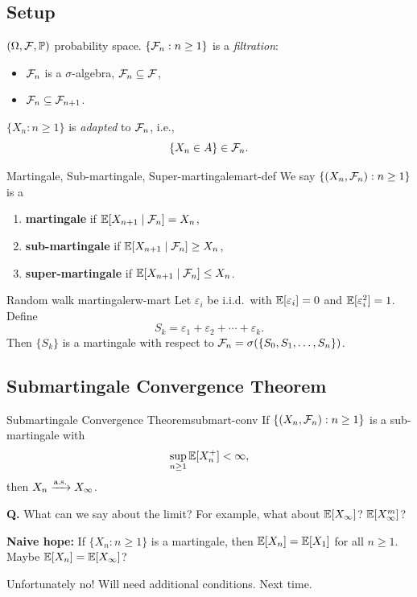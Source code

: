 \subsection{Setup}

$(\Omega, \mathcal{F}, \mathbb{P})$ probability space. $\{\mathcal{F}_n : n \geq 1\}$ is a \emph{filtration}:
\begin{itemize}
    \item $\mathcal{F}_n$ is a $\sigma$-algebra, $\mathcal{F}_n \subseteq \mathcal{F}$,
    \item $\mathcal{F}_n \subseteq \mathcal{F}_{n+1}$.
\end{itemize}

$\{X_n : n \geq 1\}$ is \emph{adapted} to $\mathcal{F}_n$, i.e.,
\[
    \{X_n \in A\} \in \mathcal{F}_n.
\]

\begin{definition}{Martingale, Sub-martingale, Super-martingale}{mart-def}
    We say $\{(X_n, \mathcal{F}_n) : n \geq 1\}$ is a
    \begin{enumerate}[label=(\roman*)]
        \item \textbf{martingale} if $\mathbb{E}[X_{n+1} \mid \mathcal{F}_n] = X_n$,
        \item \textbf{sub-martingale} if $\mathbb{E}[X_{n+1} \mid \mathcal{F}_n] \geq X_n$,
        \item \textbf{super-martingale} if $\mathbb{E}[X_{n+1} \mid \mathcal{F}_n] \leq X_n$.
    \end{enumerate}
\end{definition}

\begin{example}{Random walk martingale}{rw-mart}
    Let $\varepsilon_i$ be i.i.d.\ with $\mathbb{E}[\varepsilon_i] = 0$ and $\mathbb{E}[\varepsilon_i^2] = 1$. Define
    \[
        S_k = \varepsilon_1 + \varepsilon_2 + \cdots + \varepsilon_k.
    \]
    Then $\{S_k\}$ is a martingale with respect to $\mathcal{F}_n = \sigma(\{S_0, S_1, \ldots, S_n\})$.
\end{example}

\subsection{Submartingale Convergence Theorem}

\begin{theorem}{Submartingale Convergence Theorem}{submart-conv}
    If $\{(X_n, \mathcal{F}_n) : n \geq 1\}$ is a sub-martingale with
    \[
        \sup_{n \geq 1} \mathbb{E}[X_n^+] < \infty,
    \]
    then $X_n \xrightarrow{\text{a.s.}} X_\infty$.
\end{theorem}

\noindent\textbf{Q.} What can we say about the limit? For example, what about $\mathbb{E}[X_\infty]$? $\mathbb{E}[X_\infty^m]$?

\medskip
\noindent\textbf{Naive hope:} If $\{X_n : n \geq 1\}$ is a martingale, then $\mathbb{E}[X_n] = \mathbb{E}[X_1]$ for all $n \geq 1$. Maybe $\mathbb{E}[X_n] = \mathbb{E}[X_\infty]$?

\medskip
Unfortunately no! Will need additional conditions. Next time.
